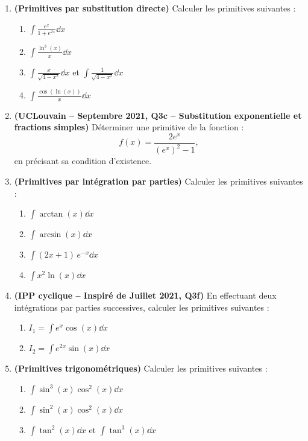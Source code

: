 \begin{enumerate}[label=\textbf{Exercice 6.\arabic* --}]
    \item \textbf{(Primitives par substitution directe)} Calculer les primitives suivantes :
    \begin{enumerate}
        \item $\displaystyle\int \frac{e^x}{1 + e^{2x}}\dd x$
        \item $\displaystyle\int \frac{\ln^3(x)}{x}\dd x$
        \item $\displaystyle\int \frac{x}{\sqrt{4 - x^2}}\dd x$ \quad et \quad $\displaystyle\int \frac{1}{\sqrt{4 - x^2}}\dd x$
        \item $\displaystyle\int \frac{\cos(\ln(x))}{x}\dd x$
    \end{enumerate}

    \item \textbf{(UCLouvain -- Septembre 2021, Q3c -- Substitution exponentielle et fractions simples)} Déterminer une primitive de la fonction :
    \[
        f(x) = \frac{2e^x}{(e^x)^2 - 1},
    \]
    en précisant sa condition d'existence.

    \item \textbf{(Primitives par intégration par parties)} Calculer les primitives suivantes :
    \begin{enumerate}
        \item $\displaystyle\int \arctan(x)\dd x$
        \item $\displaystyle\int \arcsin(x)\dd x$
        \item $\displaystyle\int (2x + 1)\,e^{-x}\dd x$
        \item $\displaystyle\int x^2\ln(x)\dd x$
    \end{enumerate}

    \item \textbf{(IPP cyclique -- Inspiré de Juillet 2021, Q3f)} En effectuant deux intégrations par parties successives, calculer les primitives suivantes :
    \begin{enumerate}
        \item $I_1 = \displaystyle\int e^x\cos(x)\dd x$
        \item $I_2 = \displaystyle\int e^{2x}\sin(x)\dd x$
    \end{enumerate}

    \item \textbf{(Primitives trigonométriques)} Calculer les primitives suivantes :
    \begin{enumerate}
        \item $\displaystyle\int \sin^3(x)\cos^2(x)\dd x$
        \item $\displaystyle\int \sin^2(x)\cos^2(x)\dd x$
        \item $\displaystyle\int \tan^2(x)\dd x$ \quad et \quad $\displaystyle\int \tan^3(x)\dd x$
    \end{enumerate}


\end{enumerate}
